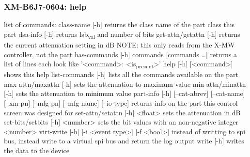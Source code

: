 \documentclass[11pt]{article}
\begin{document}
\subsubsection{XM-B6J7-0604: help}
\label{sec:orgbf21cd3}
list of commands:
  class-name [-h]
    returns the class name of the part class this part
  dsa-info [-h]
    returns lsb\textsubscript{val} and number of bits
  get-attn/getattn [-h]
    returns the current attenuation setting in dB
    NOTE: this only reads from the X-MW controller, not the part
  has-commands [-h] commands [commands \ldots{}]
    returns a list of lines each look like '<command>: <is\textsubscript{present}>'
  help [-h] [<command>]
    shows this help
  list-commands [-h]
    lists all the commands available on the part
  max-attn/maxattn [-h]
    sets the attenuation to maximum value
  min-attn/minattn [-h]
    sets the attenuation to minimum value
  part-info  [-h] [--cat-abrev] [--cat-name] [--xm-pn] [--mfg-pn] [--mfg-name]
          [--io-type]
    returns info on the part this control screen was designed for
  set-attn/setattn [-h] <float>
    sets the attenuation in dB
  set-bits/setbits [-h] <number>
    sets the bit values with an non-negative integer <number>
  virt-write [-h] [-i <event type>] [-f <bool>]
    instead of writting to spi bus, instead write to a virtual spi bus
    and return the log output
  write [-h]
    writes the data to the device
\end{document}
